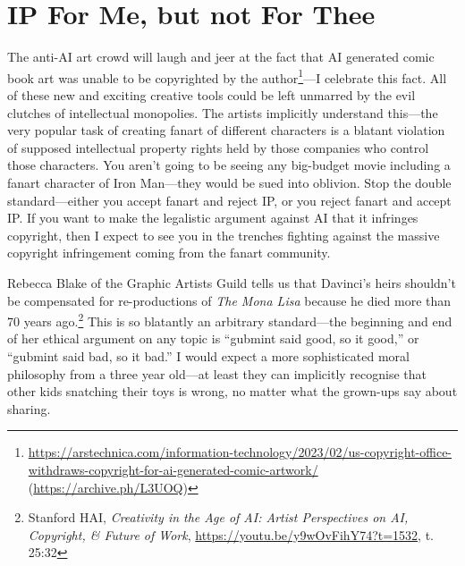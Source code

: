 \documentclass[11pt]{article}
\begin{document}
\section*{IP For Me, but not For Thee}
\label{sec:org3b52e8b}
The anti-AI art crowd will laugh and jeer at the fact that AI generated comic book art was unable to be copyrighted by the author\footnote{\url{https://arstechnica.com/information-technology/2023/02/us-copyright-office-withdraws-copyright-for-ai-generated-comic-artwork/} (\url{https://archive.ph/L3UOQ})}---I celebrate this fact. All of these new and exciting creative tools could be left unmarred by the evil clutches of intellectual monopolies. The artists implicitly understand this---the very popular task of creating fanart of different characters is a blatant violation of supposed intellectual property rights held by those companies who control those characters. You aren't going to be seeing any big-budget movie including a fanart character of Iron Man---they would be sued into oblivion. Stop the double standard---either you accept fanart and reject IP, or you reject fanart and accept IP. If you want to make the legalistic argument against AI that it infringes copyright, then I expect to see you in the trenches fighting against the massive copyright infringement coming from the fanart community.

Rebecca Blake of the Graphic Artists Guild tells us that Davinci's heirs shouldn't be compensated for re-productions of \emph{The Mona Lisa} because he died more than 70 years ago.\footnote{Stanford HAI, \emph{Creativity in the Age of AI: Artist Perspectives on AI, Copyright, \& Future of Work}, \url{https://youtu.be/y9wOvFihY74?t=1532}, t. 25:32} This is so blatantly an arbitrary standard---the beginning and end of her ethical argument on any topic is ``gubmint said good, so it good,'' or ``gubmint said bad, so it bad.'' I would expect a more sophisticated moral philosophy from a three year old---at least they can implicitly recognise that other kids snatching their toys is wrong, no matter what the grown-ups say about sharing.
\end{document}

